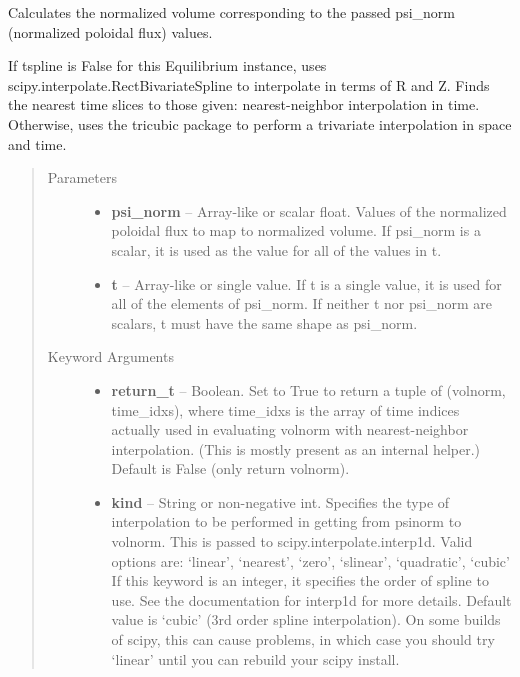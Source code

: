 \documentclass[letterpaper,10pt,english]{sphinxmanual}
\begin{document}
\begin{fulllineitems}
\begin{fulllineitems}
\end{fulllineitems}


\begin{fulllineitems}
\label{eqtools:eqtools.core.Equilibrium.psinorm2volnorm}
Calculates the normalized volume corresponding to the passed psi\_norm (normalized poloidal flux) values.

If tspline is False for this Equilibrium instance, uses
scipy.interpolate.RectBivariateSpline to interpolate in terms of R and
Z. Finds the nearest time slices to those given: nearest-neighbor
interpolation in time. Otherwise, uses the tricubic package to perform
a trivariate interpolation in space and time.
\begin{quote}\begin{description}
\item[{Parameters }] \leavevmode\begin{itemize}
\item {} 
\textbf{psi\_norm} --
Array-like or scalar float. Values of the normalized
poloidal flux to map to normalized volume. If psi\_norm is a
scalar, it is used as the value for all of the values in t.

\item {} 
\textbf{t} --
Array-like or single value. If t is a single value, it is used
for all of the elements of psi\_norm. If neither t nor psi\_norm
are scalars, t must have the same shape as psi\_norm.

\end{itemize}

\item[{Keyword Arguments}] \leavevmode\begin{itemize}
\item {} 
\textbf{return\_t} --
Boolean. Set to True to return a tuple of (volnorm,
time\_idxs), where time\_idxs is the array of time indices
actually used in evaluating volnorm with nearest-neighbor
interpolation. (This is mostly present as an internal helper.)
Default is False (only return volnorm).

\item {} 
\textbf{kind} --
String or non-negative int. Specifies the type of interpolation
to be performed in getting from psinorm to volnorm. This is
passed to scipy.interpolate.interp1d. Valid options are:
`linear', `nearest', `zero', `slinear', `quadratic', `cubic'
If this keyword is an integer, it specifies the order of spline
to use. See the documentation for interp1d for more details.
Default value is `cubic' (3rd order spline interpolation). On
some builds of scipy, this can cause problems, in which case
you should try `linear' until you can rebuild your scipy install.


\end{itemize}
\end{description}
\end{quote}
\end{fulllineitems}
\end{fulllineitems}
\end{document}
